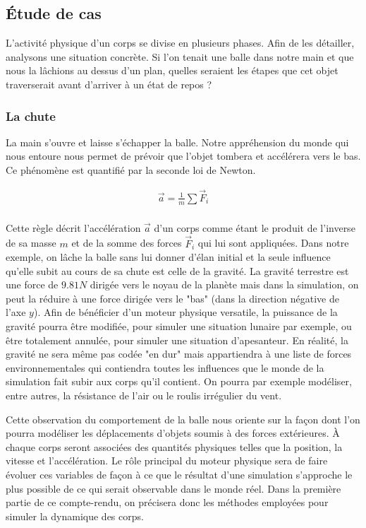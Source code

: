 \subsection{\'Etude de cas}

L'activité physique d'un corps se divise en plusieurs phases. Afin de
les détailler, analysons une situation concrète. Si l'on tenait une
balle dans notre main et que nous la lâchions au dessus d'un plan,
quelles seraient les étapes que cet objet traverserait avant d'arriver
à un état de repos ?

\subsubsection{La chute}

La main s'ouvre et laisse s'échapper la balle. Notre appréhension du
monde qui nous entoure nous permet de prévoir que l'objet tombera et
accélérera vers le bas. Ce phénomène est quantifié par la seconde loi
de Newton.

\begin{align*}
  \vec{a} = \frac{1}{m} \sum{\vec{F}_i} \\
\end{align*}

Cette règle décrit l'accélération $\vec{a}$ d'un corps comme étant le
produit de l'inverse de sa masse $m$ et de la somme des forces
$\vec{F}_i$ qui lui sont appliquées. Dans notre exemple, on lâche la
balle sans lui donner d'élan initial et la seule influence qu'elle
subit au cours de sa chute est celle de la gravité. La gravité
terrestre est une force de $9.81 N$ dirigée vers le noyau de la
planète mais dans la simulation, on peut la réduire à une force
dirigée vers le "bas" (dans la direction négative de l'axe $y$). Afin
de bénéficier d'un moteur physique versatile, la puissance de la
gravité pourra être modifiée, pour simuler une situation lunaire par
exemple, ou être totalement annulée, pour simuler une situation
d'apesanteur. En réalité, la gravité ne sera même pas codée "en dur"
mais appartiendra à une liste de forces environnementales qui
contiendra toutes les influences que le monde de la simulation fait
subir aux corps qu'il contient. On pourra par exemple modéliser, entre
autres, la résistance de l'air ou le roulis irrégulier du vent.

Cette observation du comportement de la balle nous oriente sur la
façon dont l'on pourra modéliser les déplacements d'objets soumis à
des forces extérieures. \`A chaque corps seront associées des
quantités physiques telles que la position, la vitesse et
l'accélération. Le rôle principal du moteur physique sera de faire
évoluer ces variables de façon à ce que le résultat d'une simulation
s'approche le plus possible de ce qui serait observable dans le monde
réel. Dans la première partie de ce compte-rendu, on précisera donc
les méthodes employées pour simuler la dynamique des corps.

